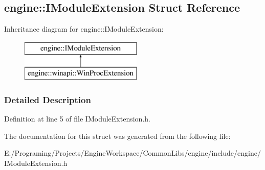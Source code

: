 \hypertarget{a00046}{}\subsection{engine\+:\+:I\+Module\+Extension Struct Reference}
\label{a00046}
Inheritance diagram for engine\+:\+:I\+Module\+Extension\+:\begin{figure}[H]
\begin{center}
\leavevmode
\includegraphics[height=2.000000cm]{a00046}
\end{center}
\end{figure}


\subsubsection{Detailed Description}


Definition at line 5 of file I\+Module\+Extension.\+h.



The documentation for this struct was generated from the following file\+:\begin{DoxyCompactItemize}
\item 
E\+:/\+Programing/\+Projects/\+Engine\+Workspace/\+Common\+Libs/engine/include/engine/I\+Module\+Extension.\+h\end{DoxyCompactItemize}
